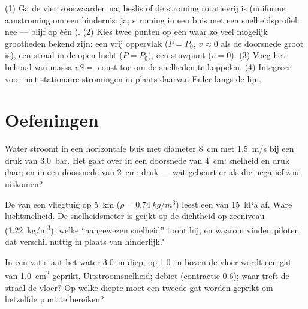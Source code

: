 \begin{method}\label{met:b2:euler-bernoulli:method}
(1) Ga de vier voorwaarden na; beslis of de stroming rotatievrij is
(uniforme aanstroming om een hindernis: ja; stroming in een buis met een
snelheidsprofiel: nee --- blijf op één ). (2) Kies twee punten op
een  waar zo veel mogelijk grootheden bekend zijn: een vrij
oppervlak ($P = P_0$, $v \approx 0$ als de doorsnede groot is), een straal
in de open lucht ($P = P_0$), een stuwpunt ($v = 0$). (3) Voeg het behoud
van massa $vS = $ const toe om de snelheden te koppelen. (4) Integreer voor
niet-stationaire stromingen in plaats daarvan Euler langs de lijn.
\end{method}

\section{Oefeningen}

\begin{exercise}[$\star$]\label{exo:b2:euler-bernoulli:1}
Water stroomt in een horizontale buis met diameter \qty{8}{cm} met
\qty{1.5}{m/s} bij een druk van \qty{3.0}{bar}. Het gaat over in een
doorsnede van \qty{4}{cm}: snelheid en druk daar; en in een doorsnede van
\qty{2}{cm}: druk --- wat gebeurt er als die negatief zou uitkomen?
\end{exercise}

\begin{exercise}[$\star$]\label{exo:b2:euler-bernoulli:2}
De  van een vliegtuig op \qty{5}{km} ($\rho = \qty{0.74}{kg/m^3}$)
leest een  van \qty{15}{kPa} af. Ware luchtsnelheid. De
snelheidsmeter is geijkt op de dichtheid op zeeniveau (\qty{1.22}{kg/m^3}):
welke ``aangewezen snelheid'' toont hij, en waarom vinden piloten dat
verschil nuttig in plaats van hinderlijk?
\end{exercise}

\begin{exercise}[$\star$]\label{exo:b2:euler-bernoulli:3}
In een vat staat het water \qty{3.0}{m} diep; op \qty{1.0}{m} boven de vloer
wordt een gat van \qty{1.0}{cm^2} geprikt. Uitstroomsnelheid; debiet
(contractie $0.6$); waar treft de straal de vloer? Op welke diepte moet een
tweede gat worden geprikt om hetzelfde punt te bereiken?
\end{exercise}

